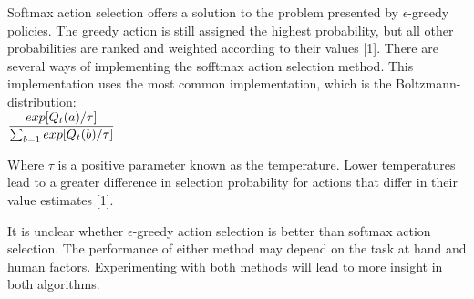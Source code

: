 \documentclass{article}
\begin{document}
Softmax action selection offers a solution to the problem presented by $\epsilon$-greedy policies. The greedy action is still assigned the highest probability, but all other probabilities are ranked and weighted according to their values [1]. There are several ways of implementing the sofftmax action selection method. This implementation uses the most common implementation, which is the Boltzmann-distribution: \\

$
\dfrac{exp[Q_t(a)/\tau]}{\sum_{b=1}exp[Q_t(b)/\tau]} \\
$

Where $\tau$ is a positive parameter known as the temperature. Lower temperatures lead to a greater difference in selection probability for actions that differ in their value estimates [1].

It is unclear whether $\epsilon$-greedy action selection is better than softmax action selection. The performance of either method may depend on the task at hand and human factors. Experimenting with both methods will lead to more insight in both algorithms.
\pagebreak
\end{document}
